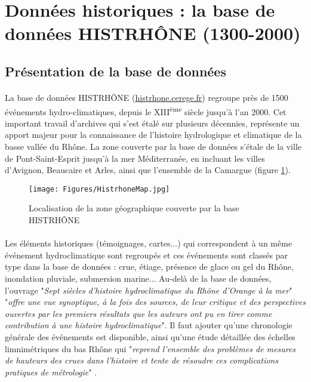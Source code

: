 \documentclass[11pt]{article}
\begin{document}
\FloatBarrier

\section{Données historiques : la base de données HISTRHÔNE (1300-2000)}

	\subsection{Présentation de la base de données}

	\paragraph{} La base de données HISTRHÔNE (\url{histrhone.cerege.fr}) \citep{pichard_sept_2014} regroupe près de 1500 événements hydro-climatiques, depuis le XIII\textsuperscript{ème} siècle jusqu'à l'an 2000. Cet important travail d'archives qui s'est étalé sur plusieurs décennies, représente un apport majeur pour la connaissance de l'histoire hydrologique et climatique de la basse vallée du Rhône. La zone couverte par la base de données s'étale de la ville de Pont-Saint-Esprit jusqu'à la mer Méditerranée, en incluant les villes d'Avignon, Beaucaire et Arles, ainsi que l'ensemble de la Camargue (figure \ref{fig:MapHistrhone}). 
	
	\begin{figure}[h]
	\centering
		\texttt{[image: Figures/HistrhoneMap.jpg]}
        \caption{Localisation de la zone géographique couverte par la base HISTRHÔNE \citep{pichard_sept_2014} }
		\label{fig:MapHistrhone}
	\end{figure}
	
	\paragraph{} Les éléments historiques (témoignages, cartes...) qui correspondent à un même événement hydroclimatique sont regroupés et ces événements sont classés par type dans la base de données : crue, étiage, présence de glace ou gel du Rhône, inondation pluviale, submersion marine... Au-delà de la base de données, l'ouvrage "\textit{Sept siècles d'histoire hydroclimatique du Rhône d'Orange à la mer}" \citep{pichard_sept_2014} "\textit{offre une vue synoptique, à la fois des sources, de leur critique et des perspectives ouvertes par les premiers résultats que les auteurs ont pu en tirer comme contribution à une histoire hydroclimatique}". Il faut ajouter qu'une chronologie générale des événements est disponible, ainsi qu'une étude détaillée des échelles limnimétriques du bas Rhône qui "\textit{reprend l'ensemble des problèmes de mesures de hauteurs des crues dans l'histoire et tente de résoudre ces complications pratiques de métrologie}" \citep{pichard_hauteurs_2013} .
	
\end{document}
